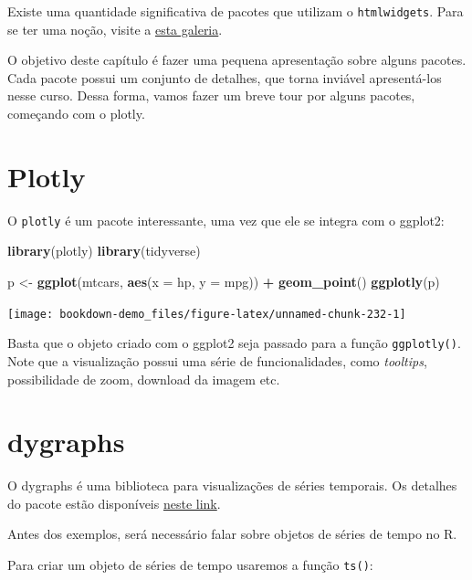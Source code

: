 \documentclass[]{book}
\newenvironment{Shaded}{\begin{snugshade}}{\end{snugshade}}
\newcommand{\KeywordTok}[1]{\textcolor[rgb]{0.13,0.29,0.53}{\textbf{#1}}}
\newcommand{\DataTypeTok}[1]{\textcolor[rgb]{0.13,0.29,0.53}{#1}}
\newcommand{\StringTok}[1]{\textcolor[rgb]{0.31,0.60,0.02}{#1}}
\newcommand{\OperatorTok}[1]{\textcolor[rgb]{0.81,0.36,0.00}{\textbf{#1}}}
\newcommand{\NormalTok}[1]{#1}
\begin{document}
Existe uma quantidade significativa de pacotes que utilizam o
\texttt{htmlwidgets}. Para se ter uma noção, visite a
\href{http://gallery.htmlwidgets.org/}{esta galeria}.

O objetivo deste capítulo é fazer uma pequena apresentação sobre alguns
pacotes. Cada pacote possui um conjunto de detalhes, que torna inviável
apresentá-los nesse curso. Dessa forma, vamos fazer um breve tour por
alguns pacotes, começando com o plotly.

\section{Plotly}\label{plotly}

O \texttt{plotly} é um pacote interessante, uma vez que ele se integra
com o ggplot2:

\begin{Shaded}
\begin{Highlighting}[]
\KeywordTok{library}\NormalTok{(plotly)}
\KeywordTok{library}\NormalTok{(tidyverse)}

\NormalTok{p <-}\StringTok{ }\KeywordTok{ggplot}\NormalTok{(mtcars, }\KeywordTok{aes}\NormalTok{(}\DataTypeTok{x =}\NormalTok{ hp, }\DataTypeTok{y =}\NormalTok{ mpg)) }\OperatorTok{+}
\StringTok{  }\KeywordTok{geom_point}\NormalTok{()}
\KeywordTok{ggplotly}\NormalTok{(p)}
\end{Highlighting}
\end{Shaded}

\begin{center}\texttt{[image: bookdown-demo\_files/figure-latex/unnamed-chunk-232-1]} \end{center}

Basta que o objeto criado com o ggplot2 seja passado para a função
\texttt{ggplotly()}. Note que a visualização possui uma série de
funcionalidades, como \emph{tooltips}, possibilidade de zoom, download
da imagem etc.

\section{dygraphs}\label{dygraphs}

O dygraphs é uma biblioteca para visualizações de séries temporais. Os
detalhes do pacote estão disponíveis
\href{https://rstudio.github.io/dygraphs/}{neste link}.

Antes dos exemplos, será necessário falar sobre objetos de séries de
tempo no R.

Para criar um objeto de séries de tempo usaremos a função \texttt{ts()}:
\end{document}
